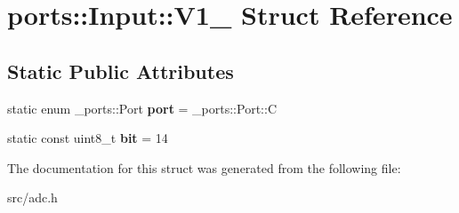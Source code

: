 \hypertarget{structports_1_1Input_1_1V1__1}{}\section{ports\+:\+:Input\+:\+:V1\+\_ Struct Reference}
\label{structports_1_1Input_1_1V1__1}
\subsection*{Static Public Attributes}
\begin{DoxyCompactItemize}
\item 
static enum \+\_\+ports\+::\+Port {\bfseries port} = \+\_\+ports\+::\+Port\+::C\hypertarget{structports_1_1Input_1_1V1__1_a232ca5dd0848f7f67c89992d37e52135}{}\label{structports_1_1Input_1_1V1__1_a232ca5dd0848f7f67c89992d37e52135}

\item 
static const uint8\+\_\+t {\bfseries bit} = 14\hypertarget{structports_1_1Input_1_1V1__1_a71fa5307ef95cb4056ad42831bdbd2d7}{}\label{structports_1_1Input_1_1V1__1_a71fa5307ef95cb4056ad42831bdbd2d7}

\end{DoxyCompactItemize}


The documentation for this struct was generated from the following file\+:\begin{DoxyCompactItemize}
\item 
src/adc.\+h\end{DoxyCompactItemize}
